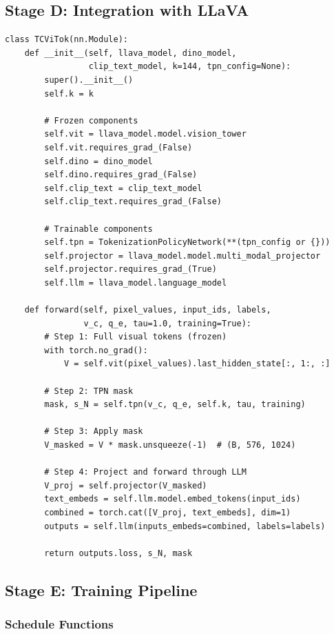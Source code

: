 \documentclass[11pt,a4paper]{article}
\begin{document}
\subsection{Stage D: Integration with LLaVA}

\begin{lstlisting}[caption={TC-ViTok wrapper (core structure).}]
class TCViTok(nn.Module):
    def __init__(self, llava_model, dino_model,
                 clip_text_model, k=144, tpn_config=None):
        super().__init__()
        self.k = k

        # Frozen components
        self.vit = llava_model.model.vision_tower
        self.vit.requires_grad_(False)
        self.dino = dino_model
        self.dino.requires_grad_(False)
        self.clip_text = clip_text_model
        self.clip_text.requires_grad_(False)

        # Trainable components
        self.tpn = TokenizationPolicyNetwork(**(tpn_config or {}))
        self.projector = llava_model.model.multi_modal_projector
        self.projector.requires_grad_(True)
        self.llm = llava_model.language_model

    def forward(self, pixel_values, input_ids, labels,
                v_c, q_e, tau=1.0, training=True):
        # Step 1: Full visual tokens (frozen)
        with torch.no_grad():
            V = self.vit(pixel_values).last_hidden_state[:, 1:, :]

        # Step 2: TPN mask
        mask, s_N = self.tpn(v_c, q_e, self.k, tau, training)

        # Step 3: Apply mask
        V_masked = V * mask.unsqueeze(-1)  # (B, 576, 1024)

        # Step 4: Project and forward through LLM
        V_proj = self.projector(V_masked)
        text_embeds = self.llm.model.embed_tokens(input_ids)
        combined = torch.cat([V_proj, text_embeds], dim=1)
        outputs = self.llm(inputs_embeds=combined, labels=labels)

        return outputs.loss, s_N, mask
\end{lstlisting}

\subsection{Stage E: Training Pipeline}

\subsubsection{Schedule Functions}
\end{document}
